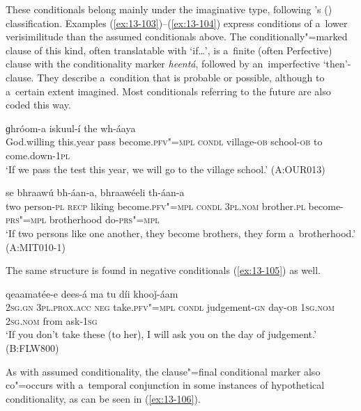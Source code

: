 These conditionals belong mainly under the imaginative type, following \citeauthor{thompsonetal2007}'s (\citeyear[259--260]{thompsonetal2007}) classification. Examples (\ref{ex:13-103})--(\ref{ex:13-104}) express conditions of a~lower verisimilitude than the assumed conditionals above. The conditionally"=marked clause of this kind, often translatable with `if{\ldots}', is a~finite (often Perfective) clause with the conditionality marker \textit{heentá}, followed by an~imperfective `then'-clause. They describe a~condition that is probable or possible, although to a~certain extent imagined. Most conditionals referring to the future are also coded this way.

\begin{exe}
\ex
\label{ex:13-103}
  ɡhróom-a iskuul-í the wh-áaya \\
 God.willing this.year  pass become.\textsc{pfv"=mpl} \textsc{condl}  village-\textsc{ob} school-\textsc{ob} to come.down-\textsc{1pl} \\
\glt `If we pass the test this year, we will go to the village school.' (A:OUR013)

\ex
\label{ex:13-104}
 se bhraawú bh-áan-a,
bhraawéeli  th-áan-a \\
two person-\textsc{pl} \textsc{recp} liking become.\textsc{pfv"=mpl}  \textsc{condl } \textsc{3pl.nom} brother.\textsc{pl} become-\textsc{prs"=mpl} brotherhood do-\textsc{prs"=mpl} \\
\glt `If two persons like one another, they become brothers, they form a~brotherhood.' (A:MIT010-1) 
\end{exe}

The same structure is found in negative conditionals (\ref{ex:13-105}) as well.

\begin{exe}
\ex
\label{ex:13-105}
  qeaamatée-e dees-á ma tu díi khooǰ-áam \\
\textsc{2sg.gn} \textsc{3pl.prox.acc} \textsc{neg} take.\textsc{pfv"=mpl} \textsc{condl} judgement-\textsc{gn} day-\textsc{ob} \textsc{1sg.nom} \textsc{2sg.nom} from ask-\textsc{1sg}  \\
\glt `If you don't take these (to her), I will ask you on the day of judgement.' (B:FLW800) 
\end{exe}

As with assumed conditionality, the clause"=final conditional marker also co"=occurs with a~temporal conjunction in some instances of hypothetical conditionality, as can be seen in (\ref{ex:13-106}). 

